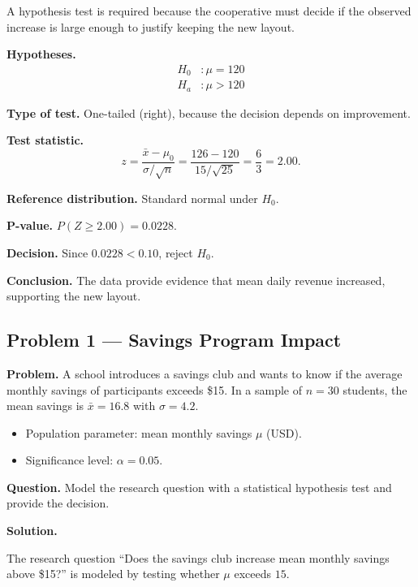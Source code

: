 	A hypothesis test is required because the cooperative must decide if the observed increase is large enough to justify keeping the new layout.
	
	\textbf{Hypotheses.}
	\[
	\begin{aligned}
		H_0&: \mu = 120 \\
		H_a&: \mu > 120
	\end{aligned}
	\]
	
	\textbf{Type of test.} One-tailed (right), because the decision depends on improvement.
	
	\textbf{Test statistic.}
	\[
	z = \frac{\bar{x}-\mu_0}{\sigma/\sqrt{n}} = \frac{126-120}{15/\sqrt{25}} = \frac{6}{3} = 2.00.
	\]
	
	\textbf{Reference distribution.} Standard normal under $H_0$.
	
	\textbf{P-value.} $P(Z\ge 2.00)=0.0228$.
	
	\textbf{Decision.} Since $0.0228<0.10$, reject $H_0$.
	
	\textbf{Conclusion.} The data provide evidence that mean daily revenue increased, supporting the new layout.
	
	
	\hypertarget{c10-ex1}{}
	\subsection*{Problem 1 — Savings Program Impact}
	
	\textbf{Problem.} A school introduces a savings club and wants to know if the average monthly savings of participants exceeds \$15. In a sample of $n=30$ students, the mean savings is $\bar{x}=16.8$ with $\sigma=4.2$.
	\begin{itemize}
		\item Population parameter: mean monthly savings $\mu$ (USD).
		\item Significance level: $\alpha=0.05$.
	\end{itemize}
	
	\textbf{Question.} Model the research question with a statistical hypothesis test and provide the decision.
	
	\textbf{Solution.}
	
	The research question “Does the savings club increase mean monthly savings above \$15?” is modeled by testing whether $\mu$ exceeds $15$.
	
